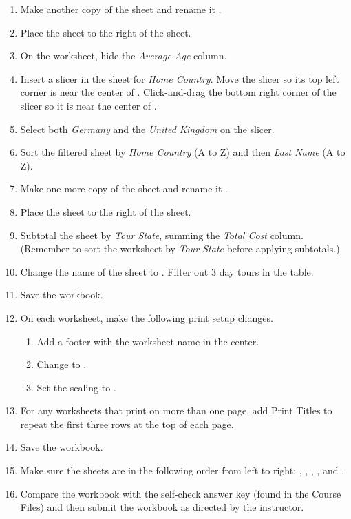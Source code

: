 \begin{enumerate}
	\item Make another copy of the  sheet and rename it . 
	\item Place the  sheet to the right of the  sheet. 
	\item On the  worksheet, hide the \textit{Average Age} column.
	\item Insert a slicer in the  sheet for \textit{Home Country}. Move the slicer so its top left corner is near the center of . Click-and-drag the bottom right corner of the slicer so it is near the center of .
	\item Select both \textit{Germany} and the \textit{United Kingdom} on the slicer.
	\item Sort the filtered sheet by \textit{Home Country} (A to Z) and then \textit{Last Name} (A to Z).

	\item Make one more copy of the  sheet and rename it .
	\item Place the  sheet to the right of the  sheet. 
	\item Subtotal the sheet by \textit{Tour State}, summing the \textit{Total Cost} column. (Remember to sort the worksheet by \textit{Tour State} before applying subtotals.)
	\item Change the name of the  sheet to . Filter out $ 3 $ day tours in the table.

	\item Save the  workbook.
	\item On each worksheet, make the following print setup changes.

	\begin{enumerate}
		\item Add a footer with the worksheet name in the center.
		\item Change to .
		\item Set the scaling to .
	\end{enumerate}

	\item For any worksheets that print on more than one page, add Print Titles to repeat the first three rows at the top of each page.
	\item Save the  workbook.
	\item Make sure the sheets are in the following order from left to right: , , , , and .
	\item Compare the workbook with the self-check answer key (found in the Course Files) and then submit the  workbook as directed by the instructor.


\end{enumerate}
